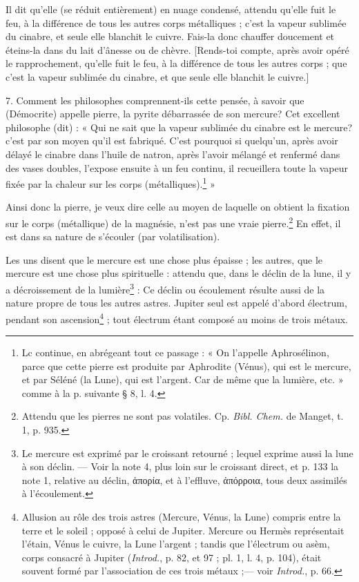 \documentclass[landscape, a4paper, 11pt, oneside, polutonikogreek, french]{article}
\begin{document}
Il dit qu'elle (se réduit entièrement) en nuage condensé, attendu qu'elle fuit le feu, à la différence de tous les autres corps métalliques ; c'est la vapeur sublimée du cinabre, et seule elle blanchit le cuivre. Fais-la donc chauffer doucement et éteins-la dans du lait d'ânesse ou de chèvre. [Rends-toi compte, après avoir opéré le rapprochement, qu'elle fuit le feu, à la différence de tous les autres corps ; que c'est la vapeur sublimée du cinabre, et que seule elle blanchit le cuivre.]

7. Comment les philosophes comprennent-ils cette pensée, à savoir que (Démocrite) appelle pierre, la pyrite débarrassée de son mercure? Cet excellent philosophe (dit) : « Qui ne sait que la vapeur sublimée du cinabre est le mercure? c'est par son moyen qu'il est fabriqué. C'est pourquoi si quelqu'un, après avoir délayé le cinabre dans l'huile de natron, après l'avoir mélangé et renfermé dans des vases doubles, l'expose ensuite à un feu continu, il recueillera toute la vapeur fixée par la chaleur sur les corps (métalliques).\footnote{Lc continue, en abrégeant tout ce passage : « On l'appelle Aphrosélinon, parce que cette pierre est produite par Aphrodite (Vénus), qui est le mercure, et par Séléné (la Lune), qui est l'argent. Car de même que la lumière, etc. » comme à la p. suivante § 8, l. 4.} »

Ainsi donc la pierre, je veux dire celle au moyen de laquelle on obtient la fixation sur le corps (métallique) de la magnésie, n'est pas une vraie pierre.\footnote{Attendu que les pierres ne sont pas volatiles. Cp. \emph{Bibl. Chem.} de Manget, t. 1, p. 935.} En effet, il est dans sa nature de s'écouler (par volatilisation).

Les uns disent que le mercure est une chose plus épaisse ; les autres, que le mercure est une chose plus spirituelle : attendu que, dans le déclin de la lune, il y a décroissement de la lumière\footnote{Le mercure est exprimé par le croissant retourné ; lequel exprime aussi la lune à son déclin. --- Voir la note 4, plus loin sur le croissant direct, et p. 133 la note 1, relative au déclin, ἀπορία, et à l'effluve, ἀπόρροια, tous deux assimilés à l'écoulement.} : Ce déclin ou écoulement résulte aussi de la nature propre de tous les autres astres. Jupiter seul est appelé d'abord électrum, pendant son ascension\footnote{Allusion au rôle des trois astres (Mercure, Vénus, la Lune) compris entre la terre et le soleil ; opposé à celui de Jupiter. Mercure ou Hermès représentait l'étain, Vénus le cuivre, la Lune l'argent ; tandis que l'électrum ou asèm, corps consacré à Jupiter (\emph{Introd.}, p. 82, et 97 ; pl. 1, l. 4, p. 104), était souvent formé par l'association de ces trois métaux ;--- voir \emph{Introd.}, p. 66.} ; tout électrum étant composé au moins de trois métaux.
\end{document}
